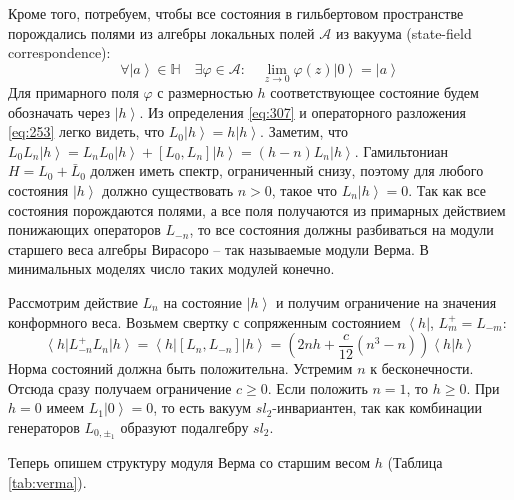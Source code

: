 \documentclass[a4paper,12pt]{article}
\theoremstyle{definition}
\theoremstyle{definition}
\theoremstyle{definition}
\begin{document}
Кроме того, потребуем, чтобы все состояния в гильбертовом пространстве порождались полями из алгебры локальных полей $\mathcal{A}$ из вакуума (state-field correspondence):
\begin{equation}
  \label{eq:307}
  \forall \left| a\right> \in \mathbb{H}\quad \exists \varphi\in\mathcal{A}:\quad \lim_{z\to 0}\varphi(z)\left|0\right>=\left|a\right>
\end{equation}
Для примарного поля $\varphi$ с размерностью $h$ соответствующее состояние будем обозначать через $\left|h\right>$. 
Из определения \eqref{eq:307} и операторного разложения \eqref{eq:253} легко видеть, что $L_{0}\left|h\right>=h\left|h\right>$.
Заметим, что $L_{0} L_{n}\left|h\right> = L_{n} L_{0}\left|h\right> + [L_{0},L_{n}]\left|h\right> = (h-n) L_{n}\left|h\right>$. 
Гамильтониан $H=L_{0}+\bar L_{0}$ должен иметь спектр, ограниченный снизу, поэтому для любого состояния $\left|h\right>$ должно существовать $n>0$, такое что $L_{n}\left|h\right> =0 $.
Так как все состояния порождаются полями, а все поля получаются из примарных действием понижающих операторов $L_{-n}$, то все состояния должны разбиваться на модули старшего веса алгебры Вирасоро -- так называемые модули Верма. В минимальных моделях число таких модулей конечно. 

Рассмотрим действие $L_{n}$ на состояние $\left|h\right>$ и получим ограничение на значения конформного веса. Возьмем свертку с сопряженным состоянием $\left<h\right|$, $L^{+}_{m}=L_{-m}$:
\begin{equation}
  \label{eq:308}
  \left<h\right|L^{+}_{-n}L_{n}\left|h\right>=\left<h\right| [L_{n},L_{-n}]\left|h\right> = \left(2nh +\frac{c}{12}(n^{3}-n)\right) \left<h|h\right>
\end{equation}
Норма состояний должна быть положительна. Устремим $n$ к бесконечности. Отсюда сразу получаем ограничение $c\geq 0$. Если положить $n=1$, то $h\geq 0$. При $h=0$ имеем $L_{1}\left|0\right>=0$, то есть вакуум $sl_{2}$-инвариантен, так как комбинации генераторов $L_{0,\pm_{1}}$ образуют подалгебру $sl_{2}$.

Теперь опишем структуру модуля Верма со старшим весом $h$ (Таблица \ref{tab:verma}).

\begin{table}[tbh]
\label{tab:verma} \noindent {}
\caption{Структура модуля Верма}
\end{table}
\end{document}
